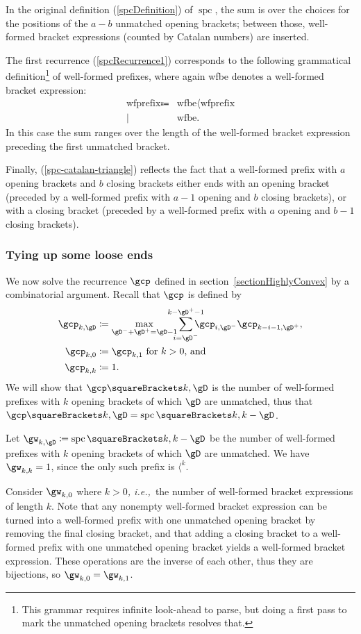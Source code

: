 \documentclass[10pt, a4paper, twoside]{basestyle}
\newcommand{\idest}{\emph{, i.e.,\ }}
\DeclareMathOperator{\spc}{spc}
\begin{document}
In the original definition (\ref{spcDefinition}) of $\spc$, the sum is over the choices for the positions of the
$a-b$ unmatched opening brackets; between those, well-formed bracket expressions (counted by Catalan numbers) are
inserted.

The first recurrence (\ref{spcRecurrence1}) corresponds to the following grammatical
definition\footnote{This grammar requires infinite look-ahead to parse, but doing a first pass to mark the
unmatched opening brackets resolves that.} of well-formed
prefixes, where again wfbe denotes a well-formed bracket expression:
\begin{align*}
\text{wfprefix} \Coloneq
& \text{wfbe} \langle \text{wfprefix} \\
\mid\: & \text{wfbe}.
\end{align*}
In this case the sum ranges over the length of the well-formed bracket expression preceding the first unmatched bracket.

Finally, (\ref{spc-catalan-triangle}) reflects the fact that a well-formed prefix with $a$ opening brackets
and $b$ closing brackets either ends with an opening bracket (preceded by a well-formed prefix with $a-1$ opening
and $b$ closing brackets), or with a closing bracket (preceded by a well-formed prefix with $a$ opening
and $b-1$ closing brackets).
\subsubsection{Tying up some loose ends}
\label{tyingLooseEnds}
We now solve the recurrence $\gcp$ defined in section~\ref{sectionHighlyConvex} by a combinatorial argument.
Recall that $\gcp$ is defined by
\begin{align*}
\gcp_{k,\gD}&\DefineAs\max_{\gD^-+\gD^+=\gD-1}\sum{i=\gD^-}[k-\gD^+-1]\gcp_{i,\gD^-}\gcp_{k-i-1,\gD^+}\text,\\
\gcp_{k,0}&\DefineAs\gcp_{k,1}\text{ for $k>0$, and}\\
\gcp_{k,k}&\DefineAs1\text.
\end{align*}
We will show that $\gcp\of{k,\gD}$ is the number of well-formed prefixes with $k$ opening brackets of which $\gD$
are unmatched, thus that $\gcp\of{k,\gD}=\spc\of{k,k-\gD}$.

Let $\gw_{k,\gD}\DefineAs\spc\of{k,k-\gD}$ be the number of well-formed prefixes with $k$ opening brackets of which $\gD$
are unmatched.
We have $\gw_{k,k}=1$, since the only such prefix is $\langle^k$.

Consider $\gw_{k,0}$ where $k>0$\idest the number of well-formed bracket expressions of length $k$. Note that any
nonempty well-formed bracket expression can be turned into a well-formed prefix with one unmatched opening bracket
by removing the final closing bracket, and that adding a closing bracket to a well-formed prefix with
one unmatched opening bracket yields a well-formed bracket expression. These operations are the inverse of each other,
thus they are bijections, so $\gw_{k,0}=\gw_{k,1}$.
\end{document}
